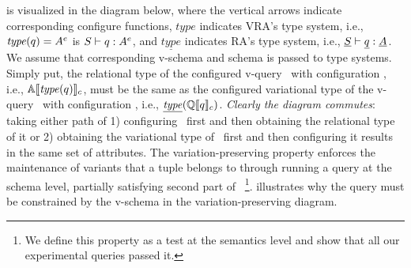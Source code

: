 %
\begin{wrapfigure}{r}{0.12\textwidth}
\begin{center}
\end{center}
\end{wrapfigure}
%
 is visualized in the diagram below, where 
the vertical arrows indicate corresponding configure functions,
\ensuremath{\mathit{type}} indicates VRA's type system, 
i.e., \ensuremath{\mathit{type}(\vQ) = \annot \vAttList} is 
\ensuremath{\envWithoutVctx \vQ {\envInContext [ \vctx] \vType}},
and
\ensuremath{\underline{\mathit{type}}} indicates RA's type system,
i.e., \ensuremath{\pEnv {\pQ} {\pAttList}}.
We assume that corresponding v-schema and schema is
passed to type systems.
Simply put, 
the relational type of the configured v-query \vQ\ with configuration \config, 
i.e., \ensuremath{\olSem {\mathit{type} (q)}},
must be the same as the configured variational type 
of the v-query \vQ\ with configuration \config, 
i.e., \ensuremath{\underline {\mathit{type}} (\eeSem {\vQ})}.
\emph{Clearly the diagram commutes}: taking either path of 1) configuring \constrain \vQ\ first and 
then obtaining the relational type of it or 
2) obtaining the variational type of \constrain \vQ\ first and then configuring it results
in the same set of attributes. 
The variation-preserving property enforces the maintenance of variants that a tuple
belongs to through running a query at the schema level, partially satisfying second part of 
\nTwo~\footnote{
We define this property as a test at the semantics level and show that
all our experimental
queries passed it.}.
%
 illustrates why the query must be constrained by the v-schema
in the variation-preserving diagram.

